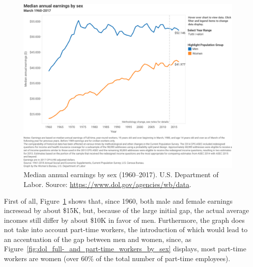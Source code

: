 \begin{figure}[t!]
\includegraphics[scale=.7]{figures/dol_earnings_by_sex.pdf}
\centering
\caption{Median annual earnings by sex (1960--2017).\newline
U.S. Department of Labor. Source: \upshape\protect\url{https://www.dol.gov/agencies/wb/data}.}
\label{fig:dol_earnings_by_sex}
\end{figure}

First of all, Figure~\ref{fig:dol_earnings_by_sex} shows that, since 1960, both male and female earnings incresead by about \$15K, but, because of the large initial gap, the actual average incomes still differ by about \$10K in favor of men. Furthermore, the graph does not take into account part-time workers, the introduction of which would lead to an accentuation of the gap between men and women, since, as Figure~\ref{fig:dol_full-_and_part-time_workers_by_sex} displays, most part-time workers are women (over 60\% of the total number of part-time employees).

